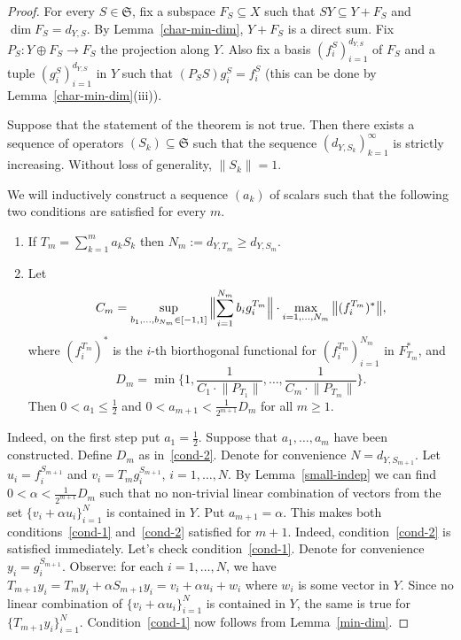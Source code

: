 \documentclass[12pt]{amsart}
\theoremstyle{plain}
\theoremstyle{definition}
\theoremstyle{remark}
\begin{document}
\begin{proof}
For every $S\in\mathfrak S$, fix a subspace $F_S\subseteq X$ such that 
$SY\subseteq Y+F_S$ and $\dim F_S=d_{Y,S}$. By Lemma~\ref{char-min-dim}, $Y+F_S$ is a direct sum. Fix $P_S:Y\oplus F_S\to F_S$ the projection along $Y$. Also fix a basis $(f_i^S)_{i=1}^{d_{Y,S}}$ of $F_S$ and a tuple $(g_i^S)_{i=1}^{d_{Y,S}}$ in $Y$ such that $(P_SS)g_i^S=f_i^S$ (this can be done by Lemma~\ref{char-min-dim}(iii)).

Suppose that the statement of the theorem is not true. Then there exists a sequence of operators $(S_k)\subseteq\mathfrak S$ such that the sequence $(d_{Y,S_k})_{k=1}^\infty$ is strictly increasing. Without loss of generality, ${\lVert{S_k}\rVert}=1$.

We will inductively construct a sequence $(a_k)$ of scalars such that the
following two conditions are satisfied for every $m$.
\begin{enumerate}
 \item\label{cond-1} If $T_m=\sum\limits_{k=1}^m a_kS_k$ then 
       $N_m:=d_{Y,T_m}{\geqslant} d_{Y,S_m}$.
 \item\label{cond-2} Let 
$$C_m=\sup\limits_{b_1,\dots,b_{N_m}\in [-1,1]}{\Bigl\lVert{\sum_{i=1}^{N_m} b_ig_i^{T_m}}\Bigr\rVert}\cdot\max_{i=1,\dots,N_m}{\bigl\lVert{(f_i^{T_m})^*}\bigr\rVert},$$
where $(f_i^{T_m})^*$ is the $i$-th biorthogonal functional for $(f_i^{T_m})_{i=1}^{N_m}$ in $F_{T_m}^*$, and
$$
 D_m=\min\Big\{1,\frac{1}{C_1\cdot{\lVert{P_{T_1}}\rVert}},\dots,
 \frac{1}{C_m\cdot{\lVert{P_{T_m}}\rVert}}\Big\}.
$$
Then $0<a_1{\leqslant}\frac{1}{2}$ and $0<a_{m+1}<\tfrac{1}{2^{m+1}}D_m$ for all $m{\geqslant} 1$.
\end{enumerate}

Indeed, on the first step put $a_1=\frac{1}{2}$. Suppose that $a_1,\dots,a_m$ have been constructed. Define $D_m$ as in~\eqref{cond-2}. Denote for convenience $N=d_{Y,S_{m+1}}$. Let $u_i=f_i^{S_{m+1}}$ and $v_i=T_mg_i^{S_{m+1}}$, $i=1,\dots,N$. By Lemma~\ref{small-indep} we can find $0<\alpha<\frac{1}{2^{m+1}}D_m$ such that no non-trivial linear combination of vectors from the set $\{v_i+\alpha u_i\}_{i=1}^{N}$ is contained in $Y$. Put $a_{m+1}=\alpha$. This makes both conditions~\eqref{cond-1} and~\eqref{cond-2} satisfied for $m+1$. Indeed, condition~\eqref{cond-2} is satisfied immediately. Let's check condition~\eqref{cond-1}. Denote for convenience $y_i=g_i^{S_{m+1}}$. Observe: for each $i=1,\dots, N$, we have $T_{m+1}y_i=T_my_i+\alpha S_{m+1}y_i=v_i+\alpha u_i+w_i$ where $w_i$ is some vector in $Y$. Since no linear combination of $\{v_i+\alpha u_i\}_{i=1}^{N}$ is contained in $Y$, the same is true for $\{T_{m+1}y_i\}_{i=1}^N$. Condition~\eqref{cond-1} now follows from Lemma~\ref{min-dim}.


\end{proof}
\end{document}
